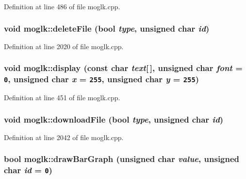 Definition at line 486 of file moglk.cpp.\hypertarget{classmoglk_a1953b9ffbeb39433686cb30fe72cdab}{
\subsubsection[{deleteFile}]{\setlength{\rightskip}{0pt plus 5cm}void moglk::deleteFile (bool {\em type}, \/  unsigned char {\em id})}}
\label{classmoglk_a1953b9ffbeb39433686cb30fe72cdab}




Definition at line 2020 of file moglk.cpp.\hypertarget{classmoglk_cf30cd08a2e1434e68b386236f4060bd}{
\subsubsection[{display}]{\setlength{\rightskip}{0pt plus 5cm}void moglk::display (const char {\em text}\mbox{[}$\,$\mbox{]}, \/  unsigned char {\em font} = {\tt 0}, \/  unsigned char {\em x} = {\tt 255}, \/  unsigned char {\em y} = {\tt 255})}}
\label{classmoglk_cf30cd08a2e1434e68b386236f4060bd}




Definition at line 451 of file moglk.cpp.\hypertarget{classmoglk_f8a03d73de173bee806acf9d51cba608}{
\subsubsection[{downloadFile}]{\setlength{\rightskip}{0pt plus 5cm}void moglk::downloadFile (bool {\em type}, \/  unsigned char {\em id})}}
\label{classmoglk_f8a03d73de173bee806acf9d51cba608}




Definition at line 2042 of file moglk.cpp.\hypertarget{classmoglk_cf8048cc54c879ae2ee4942ce451c108}{
\subsubsection[{drawBarGraph}]{\setlength{\rightskip}{0pt plus 5cm}bool moglk::drawBarGraph (unsigned char {\em value}, \/  unsigned char {\em id} = {\tt 0})}}
\label{classmoglk_cf8048cc54c879ae2ee4942ce451c108}




